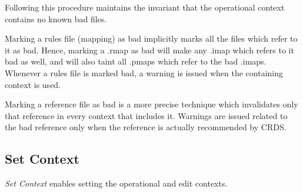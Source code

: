\documentclass[letterpaper,10pt,english]{sphinxmanual}
\begin{document}
Following this procedure maintains the invariant that the operational context
contains no known bad files.
\begin{figure}[htbp]
\centering

\end{figure}

Marking a rules file (mapping) as bad implicitly marks all the files
which refer to it as bad.  Hence,  marking a .rmap as bad will make
any .imap which refers to it bad as well,  and will also taint all .pmaps
which refer to the bad .imaps.   Whenever a rules file is marked bad,
a warning is issued when the containing context is used.

Marking a reference file as bad is a more precise technique which invalidates
only that reference in every context that includes it.   Warnings are issued related
to the bad reference only when the reference is actually recommended by CRDS.


\subsection{Set Context}
\label{web_site_use:set-context}
\emph{Set Context} enables setting the operational and edit contexts.
\begin{figure}[htbp]
\centering

\end{figure}
\end{document}
